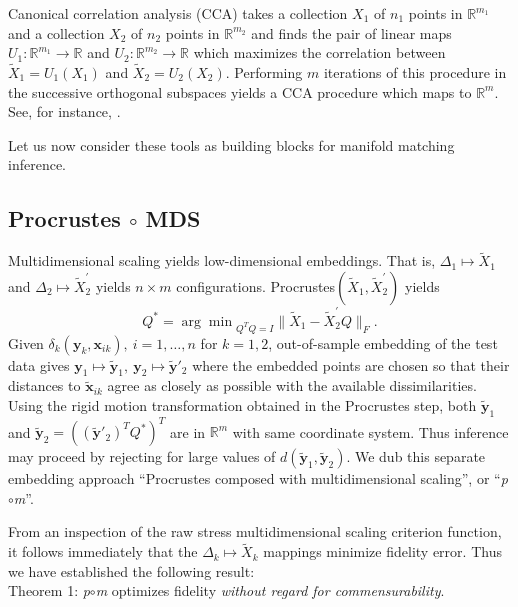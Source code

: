 \documentclass[12pt,xcolor]{article}
\newcommand{\argmin}{\ensuremath{\arg\min}}
\newcommand{\1}{\ensuremath{\mbox{{\bf 1}}}}
\begin{document}
Canonical correlation analysis (CCA) takes a collection $X_1$ of $n_1$ points in $\mathbb{R}^{m_1}$
and a collection $X_2$ of $n_2$ points in $\mathbb{R}^{m_2}$
and finds the pair of linear maps $U_1:\mathbb{R}^{m_1} \to \mathbb{R}$ and $U_2:\mathbb{R}^{m_2} \to \mathbb{R}$
which maximizes the correlation between $\widetilde{X}_1=U_1(X_1)$ and $\widetilde{X}_2=U_2(X_2)$.
Performing $m$ iterations of this procedure in the successive orthogonal subspaces yields a
CCA procedure which maps to $\mathbb{R}^m$. See, for instance, \cite{Hotelling1936,Mardia1980,Hardoon2004}.

Let us now consider these tools as building blocks for manifold matching inference.

\subsection{Procrustes $\circ$ MDS}

Multidimensional scaling yields low-dimensional embeddings.
That is, $\Delta_1 \mapsto \widetilde{X}_1$ and $\Delta_2 \mapsto \widetilde{X}^{\prime}_2$
yields $n \times m$ configurations. %
Procrustes$(\widetilde{X}_1, \widetilde{X}^{\prime}_2)$ yields
$$Q^* = \argmin_{Q^TQ = I} \|\widetilde{X}_1 - \widetilde{X}^{\prime}_2Q\|_F.$$
Given $\delta_k(\bm{y}_{k}, \bm{x}_{ik}) , \ i = 1, \ldots, n$ for $k=1,2$,
out-of-sample embedding of the test data gives $\bm{y}_1 \mapsto \widetilde{\bm{y}}_1, \ \bm{y}_2 \mapsto \widetilde{\bm{y}}'_2$
where the embedded points are chosen so that their distances to $\widetilde{\bm{x}}_{ik}$ agree as closely as possible with the available dissimilarities.
Using the rigid motion transformation obtained in the Procrustes step,
both $\widetilde{\bm{y}}_1$ and $\widetilde{\bm{y}}_2 = ((\widetilde{\bm{y}}'_2)^T Q^*)^T$ are in $\mathbb{R}^m$ with same
coordinate system.
Thus inference may proceed by rejecting for large values of $d(\widetilde{\bm{y}}_1,\widetilde{\bm{y}}_2)$.
We dub this separate embedding approach 
``Procrustes composed with multidimensional scaling'', or ``{\it p}$\circ${\it m}''.

From an inspection of the raw stress multidimensional scaling criterion function,
it follows immediately that the $\Delta_k \mapsto \widetilde{X}_k$ mappings minimize fidelity error.
Thus we have established the following result:
\\

  Theorem 1: {\it p}$\circ${\it m} optimizes fidelity {\em without regard for commensurability}.
\\
\end{document}
